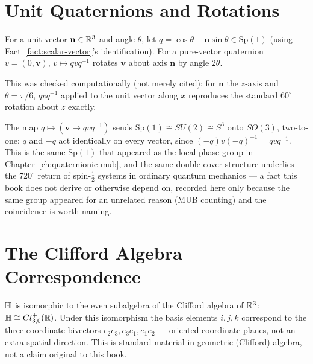 \section{Unit Quaternions and Rotations}

\begin{fact}
\label{fact:rotation-formula}
For a unit vector $\mathbf n\in\mathbb{R}^3$ and angle $\theta$, let $q =
\cos\theta + \mathbf n\sin\theta \in \mathrm{Sp}(1)$ (using
Fact~\ref{fact:scalar-vector}'s identification). For a pure-vector
quaternion $v=(0,\mathbf v)$, $v \mapsto qvq^{-1}$ rotates $\mathbf v$
about axis $\mathbf n$ by angle $2\theta$.
\end{fact}

This was checked computationally (not merely cited): for $\mathbf n$ the
$z$-axis and $\theta=\pi/6$, $qvq^{-1}$ applied to the unit vector along
$x$ reproduces the standard $60^\circ$ rotation about $z$ exactly.

\begin{fact}
The map $q \mapsto (\mathbf v \mapsto qvq^{-1})$ sends $\mathrm{Sp}(1) \cong
SU(2) \cong S^3$ onto $SO(3)$, two-to-one: $q$ and $-q$ act identically on
every vector, since $(-q)v(-q)^{-1} = qvq^{-1}$. This is the same
$\mathrm{Sp}(1)$ that appeared as the local phase group in
Chapter~\ref{ch:quaternionic-mub}, and the same double-cover structure
underlies the $720^\circ$ return of spin-$\tfrac12$ systems in ordinary
quantum mechanics — a fact this book does not derive or otherwise depend
on, recorded here only because the same group appeared for an unrelated
reason (MUB counting) and the coincidence is worth naming.
\end{fact}

\section{The Clifford Algebra Correspondence}

\begin{fact}
\label{fact:clifford}
$\mathbb{H}$ is isomorphic to the even subalgebra of the Clifford algebra of
$\mathbb{R}^3$: $\mathbb{H} \cong Cl^+_{3,0}(\mathbb{R})$. Under this isomorphism the basis
elements $i,j,k$ correspond to the three coordinate bivectors $e_2e_3,
e_3e_1, e_1e_2$ — oriented coordinate planes, not an extra spatial
direction. This is standard material in geometric (Clifford) algebra,
not a claim original to this book.
\end{fact}

